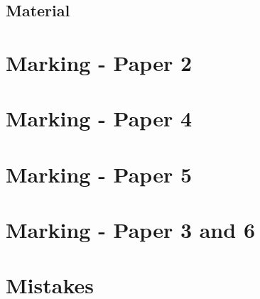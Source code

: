 \documentclass[a4paper]{article}
\begin{document}
\subsection{Material}

\begin{concept}
\end{concept}

\begin{concept}
\end{concept}

\begin{concept}
\end{concept}

\begin{concept}
\end{concept}

\begin{concept}
\end{concept}

\begin{concept}
\end{concept}

\begin{concept}
\end{concept}

\begin{concept}
\end{concept}

\begin{concept}
\end{concept}

\section{Marking - Paper 2}

\section{Marking - Paper 4}

\section{Marking - Paper 5}

\section{Marking - Paper 3 and 6}


\section{Mistakes}
\end{document}
